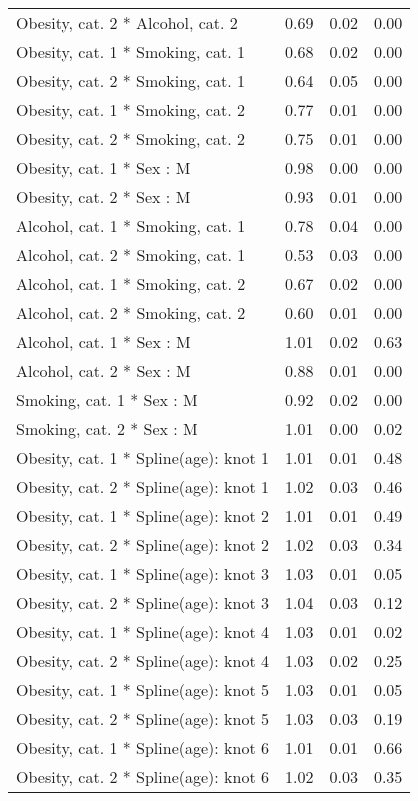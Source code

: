 \documentclass{article}
\begin{document}
\begin{longtable}{lrrr}
Obesity, cat. 2 * Alcohol, cat. 2 & 0.69 & 0.02 & 0.00 \\ 
Obesity, cat. 1 * Smoking, cat. 1 & 0.68 & 0.02 & 0.00 \\ 
Obesity, cat. 2 * Smoking, cat. 1 & 0.64 & 0.05 & 0.00 \\ 
Obesity, cat. 1 * Smoking, cat. 2 & 0.77 & 0.01 & 0.00 \\ 
Obesity, cat. 2 * Smoking, cat. 2 & 0.75 & 0.01 & 0.00 \\ 
Obesity, cat. 1 * Sex : M & 0.98 & 0.00 & 0.00 \\ 
Obesity, cat. 2 * Sex : M & 0.93 & 0.01 & 0.00 \\ 
Alcohol, cat. 1 * Smoking, cat. 1 & 0.78 & 0.04 & 0.00 \\ 
Alcohol, cat. 2 * Smoking, cat. 1 & 0.53 & 0.03 & 0.00 \\ 
Alcohol, cat. 1 * Smoking, cat. 2 & 0.67 & 0.02 & 0.00 \\ 
Alcohol, cat. 2 * Smoking, cat. 2 & 0.60 & 0.01 & 0.00 \\ 
Alcohol, cat. 1 * Sex : M & 1.01 & 0.02 & 0.63 \\ 
Alcohol, cat. 2 * Sex : M & 0.88 & 0.01 & 0.00 \\ 
Smoking, cat. 1 * Sex : M & 0.92 & 0.02 & 0.00 \\ 
Smoking, cat. 2 * Sex : M & 1.01 & 0.00 & 0.02 \\ 
Obesity, cat. 1 * Spline(age): knot 1 & 1.01 & 0.01 & 0.48 \\ 
Obesity, cat. 2 * Spline(age): knot 1 & 1.02 & 0.03 & 0.46 \\ 
Obesity, cat. 1 * Spline(age): knot 2 & 1.01 & 0.01 & 0.49 \\ 
Obesity, cat. 2 * Spline(age): knot 2 & 1.02 & 0.03 & 0.34 \\ 
Obesity, cat. 1 * Spline(age): knot 3 & 1.03 & 0.01 & 0.05 \\ 
Obesity, cat. 2 * Spline(age): knot 3 & 1.04 & 0.03 & 0.12 \\ 
Obesity, cat. 1 * Spline(age): knot 4 & 1.03 & 0.01 & 0.02 \\ 
Obesity, cat. 2 * Spline(age): knot 4 & 1.03 & 0.02 & 0.25 \\ 
Obesity, cat. 1 * Spline(age): knot 5 & 1.03 & 0.01 & 0.05 \\ 
Obesity, cat. 2 * Spline(age): knot 5 & 1.03 & 0.03 & 0.19 \\ 
Obesity, cat. 1 * Spline(age): knot 6 & 1.01 & 0.01 & 0.66 \\ 
Obesity, cat. 2 * Spline(age): knot 6 & 1.02 & 0.03 & 0.35 \\ 

\end{longtable}
\end{document}
